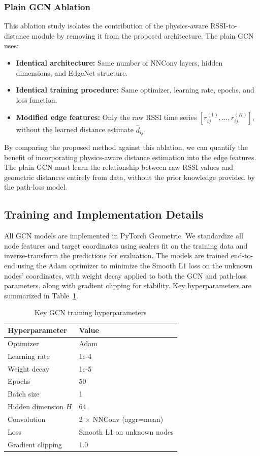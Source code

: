 \documentclass{ieeeaccess}
\begin{document}
\subsubsection{Plain GCN Ablation}
This ablation study isolates the contribution of the physics-aware RSSI-to-distance module by removing it from the proposed architecture. The plain GCN uses:
\begin{itemize}
    \item \textbf{Identical architecture:} Same number of NNConv layers, hidden dimensions, and EdgeNet structure.
    \item \textbf{Identical training procedure:} Same optimizer, learning rate, epochs, and loss function.
    \item \textbf{Modified edge features:} Only the raw RSSI time series $[r_{ij}^{(1)}, \ldots, r_{ij}^{(K)}]$, without the learned distance estimate $\hat{d}_{ij}$.
\end{itemize}
By comparing the proposed method against this ablation, we can quantify the benefit of incorporating physics-aware distance estimation into the edge features. The plain GCN must learn the relationship between raw RSSI values and geometric distances entirely from data, without the prior knowledge provided by the path-loss model.

\subsection{Training and Implementation Details}
All GCN models are implemented in PyTorch Geometric. We standardize all node features and target coordinates using scalers fit on the training data and inverse-transform the predictions for evaluation. The models are trained end-to-end using the Adam optimizer to minimize the Smooth L1 loss on the unknown nodes' coordinates, with weight decay applied to both the GCN and path-loss parameters, along with gradient clipping for stability. Key hyperparameters are summarized in Table~\ref{tab:hyperparams}.

\begin{table}[!t]
\caption{Key GCN training hyperparameters\label{tab:hyperparams}}
\centering
\begin{tabular}{p{}|p{}}
\hline
\textbf{Hyperparameter} & \textbf{Value}\\
\hline
Optimizer & Adam\\
Learning rate & 1e-4\\
Weight decay & 1e-5\\
Epochs & 50\\
Batch size & 1\\
Hidden dimension $H$ & 64\\
Convolution & 2 $\times$ NNConv (aggr=mean)\\
Loss & Smooth L1 on unknown nodes\\
Gradient clipping & 1.0\\
\hline
\end{tabular}
\end{table}
\end{document}
